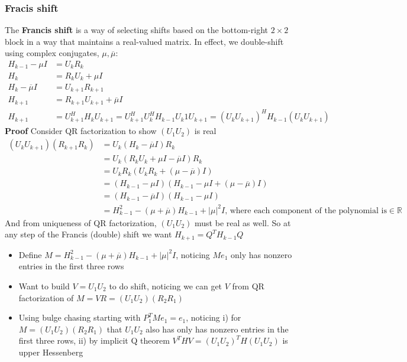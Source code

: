 \documentclass{article}
\newcommand{\abs}[1]{\lvert#1\rvert}
\begin{document}
\subsubsection{Fracis shift}
The \textbf{Francis shift} is a way of selecting shifts based on the bottom-right $2\times 2$ block in a way that maintains a real-valued matrix. In effect, we double-shift using complex conjugates, $\mu, \overline{\mu}$:
\begin{align*}
    H_{k-1} - \mu I &= U_kR_k\\
    H_k &= R_kU_k + \mu I\\
    H_k - \overline{\mu}I &= U_{k+1}R_{k+1}\\
    H_{k+1} &= R_{k+1}U_{k+1} + \overline{\mu}I\\
    H_{k+1} &= U^H_{k+1}H_kU_{k+1} = U^H_{k+1}U^H_kH_{k-1}U_k1U_{k+1} = (U_kU_{k+1})^HH_{k-1}(U_kU_{k+1})
\end{align*}
\textbf{Proof} Consider QR factorization to show $(U_1U_2)$ is real
\begin{align*}
    (U_kU_{k+1})(R_{k+1}R_k) &= U_k(H_k - \overline{\mu}I)R_k\\
    &= U_k(R_kU_k + \mu I - \overline{\mu}I)R_k\\
    &= U_kR_k(U_kR_k + (\mu - \overline{\mu})I)\\
    &= (H_{k-1} - \mu I)(H_{k-1} - \mu I + (\mu - \overline{\mu})I)\\
    &= (H_{k-1} - \overline{\mu}I)(H_{k-1} - \mu I)\\
    &= H_{k-1}^2 - (\mu + \overline{\mu})H_{k-1} + \abs{\mu}^2I \textrm{, where each component of the polynomial is} \in \mathbb{R}
\end{align*}
And from uniqueness of QR factorization, $(U_1U_2)$ must be real as well. So at any step of the Francis (double) shift we want $H_{k+1} = Q^TH_{k-1}Q$
\begin{itemize}
    \item Define $M = H_{k-1}^2 - (\mu + \overline{\mu})H_{k-1} + \abs{\mu}^2I$, noticing $Me_1$ only has nonzero entries in the first three rows
    \item Want to build $V = U_1U_2$ to do shift, noticing we can get $V$ from QR factorization of $M = VR = (U_1U_2)(R_2R_1)$
    \item Using bulge chasing starting with $P_1^TMe_1 = e_1$, noticing i) for $M = (U_1U_2)(R_2R_1)$ that $U_1U_2$ also has only has nonzero entries in the first three rows, ii) by implicit Q theorem $V^THV = (U_1U_2)^TH(U_1U_2)$ is upper Hessenberg
\end{itemize}
\end{document}
